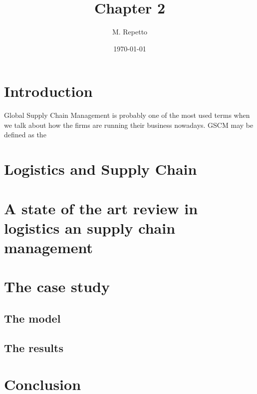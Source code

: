\documentclass{article}
\begin{document}
\title{Chapter 2}

\author{M. Repetto}

\date{\today}

\maketitle

\begin{abstract}

\end{abstract}

\section{Introduction}
Global Supply Chain Management is probably one of the most used terms when we talk about how the firms are running their business nowadays. GSCM may be defined as the 

\section{Logistics and Supply Chain}

\section{A state of the art review in logistics an supply chain management}

\section{The case study}
\subsection{The model}
\subsection{The results}

\section{Conclusion}
\end{document}
